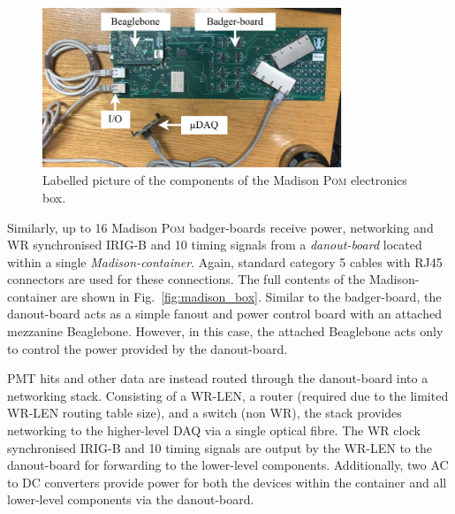 \begin{figure} %
    \includegraphics[width=0.8\textwidth]{diagrams/5-daq/madison_plane.pdf}
    \caption[Labelled picture of the components of the Madison \textsc{Pom} electronics box]
    {Labelled picture of the components of the Madison \textsc{Pom} electronics box.}
    \label{fig:madison_plane}
\end{figure}

Similarly, up to 16 Madison \textsc{Pom} badger-boards receive power, networking and WR
synchronised IRIG-B and \unit{10}{} timing signals from a \emph{danout-board} located
within a single \emph{Madison-container}. Again, standard category 5 cables with RJ45 connectors
are used for these connections. The full contents of the Madison-container are shown in
Fig.~\ref{fig:madison_box}. Similar to the badger-board, the danout-board acts as a simple fanout
and power control board with an attached mezzanine Beaglebone. However, in this case, the attached
Beaglebone acts only to control the power provided by the danout-board.

PMT hits and other data are instead routed through the danout-board into a networking stack.
Consisting of a WR-LEN, a router (required due to the limited WR-LEN routing table size), and a
switch (non WR), the stack provides networking to the higher-level DAQ via a single optical fibre.
The WR clock synchronised IRIG-B and \unit{10}{} timing signals are output by the WR-LEN
to the danout-board for forwarding to the lower-level components. Additionally, two AC to DC
converters provide power for both the devices within the container and all lower-level components
via the danout-board.

